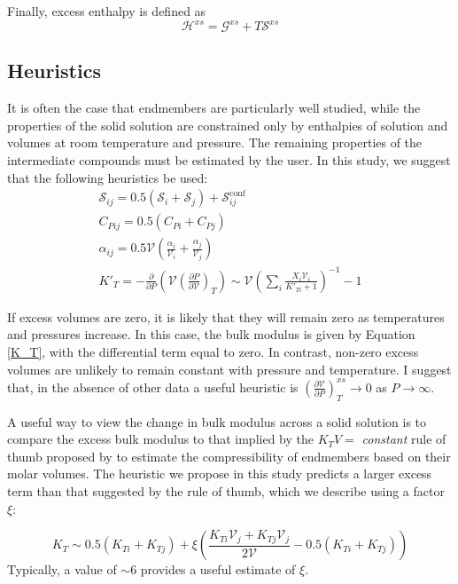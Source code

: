 Finally, excess enthalpy is defined as
\begin{equation}
 \mathcal{H}^{xs} = \mathcal{G}^{xs} + T\mathcal{S}^{xs}
\end{equation}

\subsection{Heuristics}
It is often the case that endmembers are particularly well studied, while the properties of the solid solution are constrained only by enthalpies of solution and volumes at room temperature and pressure. The remaining properties of the intermediate compounds must be estimated by the user. In this study, we suggest that the following heuristics be used:
\begin{eqnarray}
  \mathcal{S}_{ij} = 0.5(\mathcal{S}_i + \mathcal{S}_j) + \mathcal{S}^{\textrm{conf}}_{ij} \\
  C_{P{ij}} = 0.5(C_{P{i}} + C_{P{j}}) \\
  \alpha_{ij} = 0.5 \mathcal{V} \left(\frac{\alpha_i}{\mathcal{V}_i} + \frac{\alpha_j}{\mathcal{V}_j}\right)\\
  K'_{T} = -\frac{\partial}{\partial P} \left (\mathcal{V}\left( \frac{\partial P}{\partial \mathcal{V}} \right)_T \right) \sim \mathcal{V} \left(\sum_i \frac{X_i \mathcal{V}_i}{K'_{Ti} + 1} \right)^{-1} - 1
\end{eqnarray}

If excess volumes are zero, it is likely that they will remain zero as temperatures and pressures increase. In this case, the bulk modulus is given by Equation \ref{K_T}, with the differential term equal to zero. In contrast, non-zero excess volumes are unlikely to remain constant with pressure and temperature. I suggest that, in the absence of other data a useful heuristic is $\left( \frac{\partial \mathcal{V}}{\partial P} \right)_T^{xs} \rightarrow 0$ as $P \rightarrow \infty$.

A useful way to view the change in bulk modulus across a solid solution is to compare the excess bulk modulus to that implied by the $K_TV =$ \emph{constant} rule of thumb proposed by \cite{AA1970} to estimate the compressibility of endmembers based on their molar volumes. The heuristic we propose in this study predicts a larger excess term than that suggested by the rule of thumb, which we describe using a factor $\xi$:

\begin{equation}
  K_{T} \sim 0.5(K_{Ti} + K_{Tj}) + \xi \left(\frac{K_{Ti}\mathcal{V}_{j} + K_{Tj}\mathcal{V}_{j}}{2 \mathcal{V}} - 0.5(K_{Ti} + K_{Tj})\right)
  \label{K_T_heuristic}
\end{equation}
\noindent Typically, a value of $\sim$6 provides a useful estimate of $\xi$.

